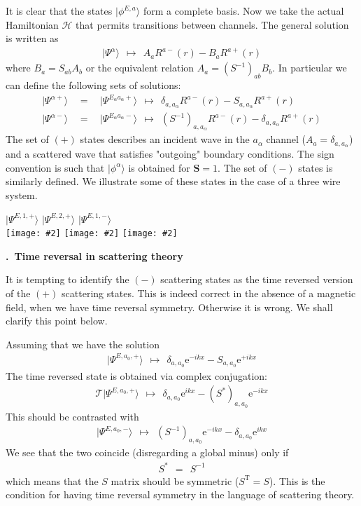 \documentclass[onecolumn,fleqn, 11pt]{revtex4}
\newcommand{\eexp}{\mathrm{e}^}
\newcommand{\tbox}[1]{\text{#1}}
\newcommand{\putgraph}[2][0.30\hsize]{\texttt{[image: \#2]}}
\newcommand{\beq}{\begin{eqnarray}}
\newcommand{\eeq}{\end{eqnarray}}
\renewcommand{\thesubsection}{\arabic{subsection}}
\renewcommand{\thesubsubsection}{\arabic{subsubsection}}
\newcommand{\sheadC}[1]
{
\addtocounter{subsubsection}{1}
\vspace{5mm}
{\bf \thesubsection.\thesubsubsection \ #1}  
\nopagebreak
\phantomsection
}
\begin{document}
It is clear that the states $|\phi^{E,a}\rangle$ form a complete basis. 
Now we take the actual Hamiltonian $\mathcal{H}$ that permits 
transitions between channels. The general solution is written as
\beq
|\Psi^{\alpha}\rangle  
\ \ \longmapsto \ \  
A_a R^{a-}(r) - B_a R^{a+}(r) 
\eeq
where $B_a = S_{ab}A_b$ or the equivalent relation $A_a=(S^{-1})_{ab}B_b$. 
In particular we can define the following sets of solutions: 
\beq
|\Psi^{\alpha+} \rangle 
& \ \ = \ \ & 
|\Psi^{E_{\alpha}a_{\alpha}+}\rangle 
\ \ \longmapsto \ \ 
\delta_{a,a_{\alpha}} R^{a-}(r) - S_{a,a_{\alpha}} R^{a+}(r) 
\\ \nonumber
|\Psi^{\alpha-} \rangle 
& \ \ = \ \ & 
|\Psi^{E_{\alpha}a_{\alpha}-}\rangle 
\ \ \longmapsto \ \ 
(S^{-1})_{a,a_{\alpha}} R^{a-}(r) - \delta_{a,a_{\alpha}} R^{a+}(r) 
\eeq
The set of $(+)$ states describes an incident wave 
in the $a_{\alpha}$ channel ($A_a=\delta_{a,a_{\alpha}}$)  
and a scattered wave that satisfies "outgoing" 
boundary conditions. The sign convention is such 
that ${|\phi^{\alpha}\rangle}$ is obtained for ${\bm{S}=1}$.
The set of $(-)$ states is similarly defined.
We illustrate some of these states 
in the case of a three wire system.

\begin{center}
$|\Psi^{E,1,+}\rangle$ 
\hspace{0.22\hsize} 
$|\Psi^{E,2,+}\rangle$ 
\hspace{0.25\hsize} 
$|\Psi^{E,1,-}\rangle$ \\
\putgraph[0.2\hsize]{ThreeWiresFirstStateScattering.jpg}
\hspace{0.1\hsize} 
\putgraph[0.2\hsize]{ThreeWiresSecondStateScattering.jpg}
\hspace{0.1\hsize} 
\putgraph[0.2\hsize]{ThreeWiresFirstStateScatteringR.jpg}
\end{center}




\sheadC{Time reversal in scattering theory}

It is tempting to identify the $(-)$ scattering states  
as the time reversed version of the $(+)$
scattering states.
This is indeed correct in the absence 
of a magnetic field, when we have time reversal 
symmetry. Otherwise it is wrong.  
We shall clarify this point below.

Assuming that we have the solution 
\beq
|\Psi^{E,a_0,+}\rangle 
\ \ \longmapsto \ \ 
\delta_{a,a_0}\eexp{-ikx} - S_{a,a_0}\eexp{+ikx}
\eeq
The time reversed state is obtained via complex conjugation: 
\beq
\mathcal{T}|\Psi^{E,a_0,+}\rangle 
\ \ \longmapsto \ \ 
\delta_{a,a_0}\eexp{ikx} - (S^*)_{a,a_0}\eexp{-ikx}
\eeq
This should be contrasted with 
\beq
|\Psi^{E,a_0,-}\rangle 
\ \ \longmapsto \ \ 
(S^{-1})_{a,a_0} \eexp{-ikx} - \delta_{a,a_0}\eexp{ikx} 
\eeq
We see that the two coincide (disregarding a global minus) only if 
\beq
S^* \ \ = \ \ S^{-1}
\eeq
which means that the $S$ matrix should be symmetric ($S^{\tbox{T}}=S$). 
This is the condition for having time reversal symmetry 
in the language of scattering theory. 
\end{document}
